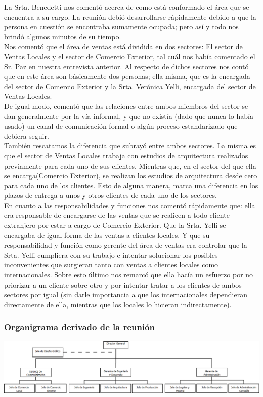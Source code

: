 \documentclass[a4paper,10pt,titlepage]{article}
\begin{document}
La Srta. Benedetti nos coment\'o acerca de como est\'a conformado el \'area que se encuentra a su cargo. La reuni\'on debi\'o desarrollarse r\'apidamente debido a que la persona en cuesti\'on se encontraba sumamente ocupada; pero as\'i y todo nos brind\'o algunos minutos de su tiempo.
\\ Nos coment\'o que el \'area de ventas est\'a dividida en dos sectores: El sector de Ventas Locales y el sector de Comercio Exterior, tal cu\'al nos hab\'ia comentado el Sr. Paz en nuestra entrevista anterior.
Al respecto de dichos sectores nos cont\'o que en este \'area son b\'asicamente dos personas; ella misma, que es la encargada del sector de Comercio Exterior y la Srta. Ver\'onica  Yelli, encargada del sector de Ventas Locales.
\\ De igual modo, coment\'o que las relaciones entre ambos miembros del sector se dan generalmente por la v\'ia informal, y que no exist\'ia (dado que nunca lo hab\'ia usado) un canal de comunicaci\'on formal o alg\'un proceso estandarizado que debiera seguir.
\\ Tambi\'en rescatamos la diferencia que subray\'o entre ambos sectores. La misma es que el sector de Ventas Locales trabaja con estudios de arquitectura realizados previamente para cada uno de sus clientes. Mientras que, en el sector del que ella se encarga(Comercio Exterior), se realizan
los estudios de arquitectura desde cero para cada uno de los clientes. Esto de alguna manera, marca una diferencia en los plazos de entrega a unos y otros clientes de cada uno de los sectores.
\\ En cuanto a las responsabilidades y funciones nos coment\'o r\'apidamente que: ella era responsable de encargarse de las ventas que se realicen a todo cliente extranjero por estar a cargo de Comercio Exterior. Que la Srta. Yelli se encargaba de igual forma de las ventas a clientes locales.
Y que su responsabilidad y funci\'on como gerente del \'area de ventas era controlar que la Srta. Yelli cumpliera con su trabajo e intentar solucionar los posibles inconvenientes que surgieran tanto con ventas a clientes locales como internacionales. Sobre esto \'ultimo nos remarc\'o que ella
hac\'ia un esfuerzo por no priorizar a un cliente sobre otro y por intentar tratar a los clientes de ambos sectores por igual (sin darle importancia a que los internacionales dependieran directamente de ella, mientras que los locales lo hicieran indirectamente).

\subsubsection*{\textbf{Organigrama derivado de la reuni\'on}}
\begin{center}
	\includegraphics[angle=90,scale=0.45]{./Organigramas/IcomOrganigramaNuestro3.png}
\end{center}
\end{document}
